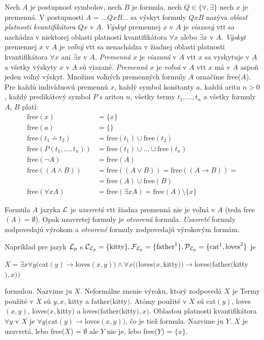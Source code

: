 Nech $A$ je postupnosť symbolov, nech $B$ je formula, nech $Q \in \{\forall, \exists\}$ nech $x$ je premenná.
V postupnosti $A$ = $… Qx B …$ sa výskyt formuly $Qx B$ nazýva \emph{oblasť platnosti kvantifikátora} $Qx$ v $A$.
\emph{Výskyt} premennej $x$ v $A$ je \emph{viazaný} vtt sa nachádza v niektorej oblasti platnosti kvantifikátora $\forall x$ alebo $\exists x$ v $A$.
\emph{Výskyt} premennej $x$ v $A$ je \emph{voľný} vtt sa nenachádza v žiadnej oblasti platnosti kvantifikátora $\forall x$ ani $\exists x$ v $A$.
\emph{Premenná} $x$ je \emph{viazaná} v $A$ vtt $x$ sa vyskytuje v $A$ a všetky výskyty $x$ v $A$ sú viazané.
\emph{Premenná} $x$ je \emph{voľná} v $A$ vtt $x$ má v $A$ aspoň jeden voľný výskyt.
Množinu voľných premenných formuly $A$ označíme free($A$).
Pre každú indivíduovú premennú $x$, každý symbol konštanty $a$, každú aritu $n > 0$, každý predikátový symbol $P$ s aritou $n$, všetky termy $t_1, ..., t_n$ a všetky formuly $A$, $B$ platí:
\begin{align*}
\text{free}(x) &= \{x\} \\
\text{free}(a) &= \{\} \\
\text{free}(t_1 \doteq t_2) &= \text{free}(t_1) \cup \text{free}(t_2) \\
\text{free}( P(t_1, ..., t_n) ) &= \text{free}(t_1) \cup ... \cup \text{free}(t_n) \\
\text{free}( \neg A ) &= \text{free}(A) \\
\text{free}( (A \land B) ) &= \text{free}( (A \lor B) ) = \text{free}( (A \to B) ) = \\
&= \text{free}(A) \cup \text{free}(B) \\
\text{free}( \forall x A ) &= \text{free}( \exists x A ) = \text{free}(A) \setminus \{x\}
\end{align*}

Formula $A$ jazyka $\mathcal{L}$ je \emph{uzavretá} vtt žiadna premenná nie je voľná v $A$ (teda free$(A) = \emptyset$). Opak uzavretej formuly je \emph{otvorená} formula.
\emph{Uzavreté} formuly zodpovedajú výrokom a \emph{otvorené} formuly zodpovedajú výrokovým formám.

Napríklad pre jazyk $\mathcal{L}_p$ s $\mathcal{C}_{\mathcal{L}_p} = \{\text{kitty}\}, \mathcal{F}_{\mathcal{L}_p} = \{\text{father}^1\}, \mathcal{P}_{\mathcal{L}_p} = \{\text{cat}^1, \text{loves}^2\}$ je 
\begin{center}
$X = \exists x \forall y ($cat$(y) \to $loves$(x, y)) \land \forall x (($loves$(x, $kitty$)) \to $loves$($father$($kitty$), x))$
\end{center}
formulou. Nazvime ju $X$. Neformálne znenie výroku, ktorý zodpovedá $X$ je 
Termy použité v $X$ sú $y, x$, kitty a father$($kitty$)$.
Atómy použité v $X$ sú cat$(y)$, loves$(x, y)$, loves$(x, $kitty$)$ a loves$($father$($kitty$), x)$.
Oblasťou platnosti kvantifikátora $\forall y$ v $X$ je $\forall y ($cat$(y) \to $loves$(x, y))$, čo je tiež formula. Nazvime ju $Y$.
$X$ je uzavretá, lebo free($X$) = $\emptyset$ ale $Y$ nie je, lebo free($Y$) = $\{x\}$.

